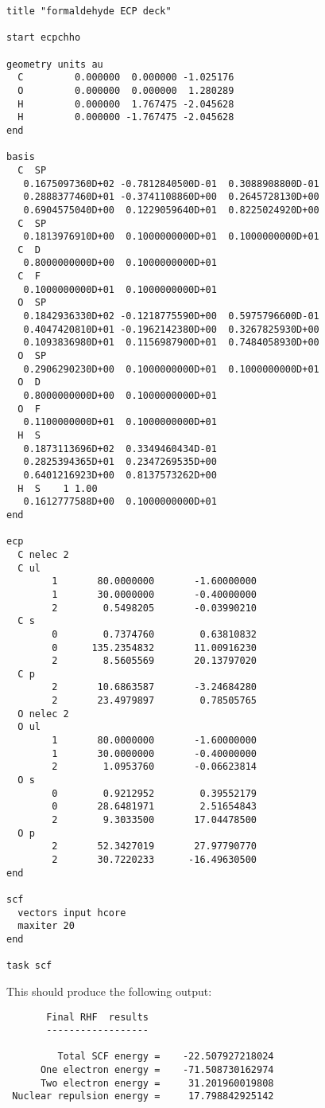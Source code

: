 \begin{verbatim}
title "formaldehyde ECP deck"

start ecpchho

geometry units au
  C         0.000000  0.000000 -1.025176
  O         0.000000  0.000000  1.280289
  H         0.000000  1.767475 -2.045628
  H         0.000000 -1.767475 -2.045628
end

basis 
  C  SP
   0.1675097360D+02 -0.7812840500D-01  0.3088908800D-01
   0.2888377460D+01 -0.3741108860D+00  0.2645728130D+00
   0.6904575040D+00  0.1229059640D+01  0.8225024920D+00
  C  SP
   0.1813976910D+00  0.1000000000D+01  0.1000000000D+01
  C  D
   0.8000000000D+00  0.1000000000D+01
  C  F
   0.1000000000D+01  0.1000000000D+01
  O  SP
   0.1842936330D+02 -0.1218775590D+00  0.5975796600D-01
   0.4047420810D+01 -0.1962142380D+00  0.3267825930D+00
   0.1093836980D+01  0.1156987900D+01  0.7484058930D+00
  O  SP
   0.2906290230D+00  0.1000000000D+01  0.1000000000D+01
  O  D
   0.8000000000D+00  0.1000000000D+01
  O  F
   0.1100000000D+01  0.1000000000D+01
  H  S
   0.1873113696D+02  0.3349460434D-01
   0.2825394365D+01  0.2347269535D+00
   0.6401216923D+00  0.8137573262D+00
  H  S    1 1.00
   0.1612777588D+00  0.1000000000D+01
end

ecp
  C nelec 2
  C ul
        1       80.0000000       -1.60000000
        1       30.0000000       -0.40000000
        2        0.5498205       -0.03990210
  C s
        0        0.7374760        0.63810832
        0      135.2354832       11.00916230
        2        8.5605569       20.13797020
  C p
        2       10.6863587       -3.24684280
        2       23.4979897        0.78505765
  O nelec 2
  O ul
        1       80.0000000       -1.60000000
        1       30.0000000       -0.40000000
        2        1.0953760       -0.06623814
  O s
        0        0.9212952        0.39552179
        0       28.6481971        2.51654843
        2        9.3033500       17.04478500
  O p
        2       52.3427019       27.97790770
        2       30.7220233      -16.49630500
end

scf
  vectors input hcore
  maxiter 20
end

task scf
\end{verbatim}

This should produce the following output:

\begin{verbatim}
       Final RHF  results 
       ------------------ 

         Total SCF energy =    -22.507927218024
      One electron energy =    -71.508730162974
      Two electron energy =     31.201960019808
 Nuclear repulsion energy =     17.798842925142
\end{verbatim}


